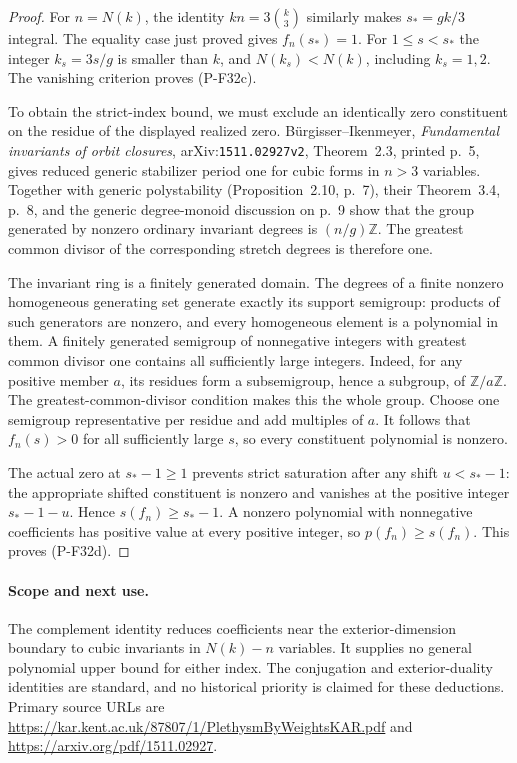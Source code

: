 \documentclass[11pt,a4paper]{article}
\begin{document}
\begin{proof}
For $n=N(k)$, the identity $kn=3\binom k3$ similarly
makes $s_*=gk/3$ integral. The equality case just proved
gives $f_n(s_*)=1$. For $1\le s<s_*$ the integer
$k_s=3s/g$ is smaller than $k$, and $N(k_s)<N(k)$,
including $k_s=1,2$. The vanishing criterion proves
(P-F32c).

To obtain the strict-index bound, we must exclude an
identically zero constituent on the residue of the
displayed realized zero. B\"urgisser--Ikenmeyer,
\emph{Fundamental invariants of orbit closures},
arXiv:\texttt{1511.02927v2}, Theorem~2.3, printed p.~5,
gives reduced generic stabilizer period one for cubic
forms in $n>3$ variables. Together with generic polystability
(Proposition~2.10, p.~7), their Theorem~3.4, p.~8, and
the generic degree-monoid discussion on p.~9 show that
the group generated by nonzero ordinary invariant
degrees is $(n/g)\mathbb Z$. The greatest common divisor
of the corresponding stretch degrees is therefore one.

The invariant ring is a finitely generated domain.
The degrees of a finite nonzero homogeneous generating
set generate exactly its support semigroup: products
of such generators are nonzero, and every homogeneous
element is a polynomial in them. A finitely generated
semigroup of nonnegative integers with greatest common
divisor one contains all sufficiently large integers.
Indeed, for any positive member $a$, its residues form
a subsemigroup, hence a subgroup, of $\mathbb Z/a\mathbb Z$.
The greatest-common-divisor condition makes this the
whole group. Choose one semigroup representative per
residue and add multiples of $a$.
It follows that $f_n(s)>0$ for all sufficiently large
$s$, so every constituent polynomial is nonzero.

The actual zero at $s_*-1\ge1$ prevents strict saturation
after any shift $u<s_*-1$: the appropriate shifted
constituent is nonzero and vanishes at the positive
integer $s_*-1-u$. Hence $s(f_n)\ge s_*-1$.
A nonzero polynomial with nonnegative coefficients
has positive value at every positive integer, so
$p(f_n)\ge s(f_n)$. This proves (P-F32d).
\end{proof}

\paragraph{Scope and next use.}
The complement identity reduces coefficients near the
exterior-dimension boundary to cubic invariants in
$N(k)-n$ variables. It supplies no general polynomial
upper bound for either index. The conjugation and
exterior-duality identities are standard, and no
historical priority is claimed for these deductions.
Primary source URLs are
\url{https://kar.kent.ac.uk/87807/1/PlethysmByWeightsKAR.pdf}
and \url{https://arxiv.org/pdf/1511.02927}.
\end{document}
